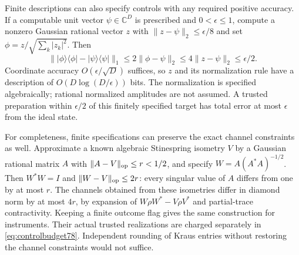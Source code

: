 Finite descriptions can also specify controls with any required
positive accuracy.  If a computable unit vector $\psi\in\mathbb C^D$
is prescribed and $0<\epsilon\le1$, compute a nonzero Gaussian
rational vector $z$ with
$\|z-\psi\|_2\le\epsilon/8$ and set
$\phi=z/\sqrt{\sum_k|z_k|^2}$.  Then
\begin{equation}\label{eq:controlstate78}
 \bigl\||\phi\rangle\langle\phi|
              -|\psi\rangle\langle\psi|\bigr\|_1
 \le2\|\phi-\psi\|_2\le4\|z-\psi\|_2\le\epsilon/2.
\end{equation}
Coordinate accuracy $O(\epsilon/\sqrt D)$ suffices, so $z$ and
its normalization rule have a description of
$O(D\log(D/\epsilon))$ bits.  The normalization is specified
algebraically; rational normalized amplitudes are not assumed.
A trusted preparation within $\epsilon/2$ of this finitely
specified target has total error at most $\epsilon$ from the ideal
state.

For completeness, finite specifications can preserve the exact
channel constraints as well.  Approximate a known algebraic
Stinespring isometry $V$ by a Gaussian rational matrix $A$ with
$\|A-V\|_{\rm op}\le r<1/2$, and specify
$W=A(A^*A)^{-1/2}$.  Then $W^*W=I$ and
$\|W-V\|_{\rm op}\le2r$: every singular value of $A$ differs
from one by at most $r$.  The channels obtained from these
isometries differ in diamond norm by at most $4r$, by expansion of
$W\rho W^*-V\rho V^*$ and partial-trace contractivity.  Keeping a
finite outcome flag gives the same construction for instruments.
Their actual trusted realizations are charged separately in
\eqref{eq:controlbudget78}.  Independent rounding of Kraus entries
without restoring the channel constraints would not suffice.

